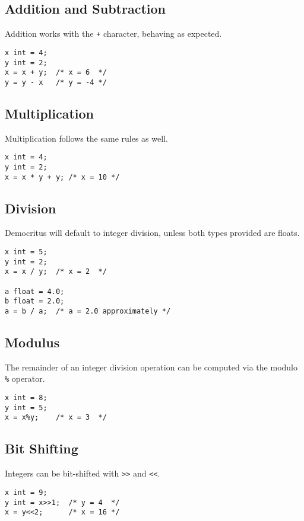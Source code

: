 		\subsection{Addition and Subtraction}
			Addition works with the \texttt{+} character, behaving as expected.
			\begin{lstlisting}
x int = 4;
y int = 2;
x = x + y; 	/* x = 6  */
y = y - x 	/* y = -4 */
			\end{lstlisting}
						
		\subsection{Multiplication}
			Multiplication follows the same rules as well. 
			\begin{lstlisting}
x int = 4;
y int = 2;
x = x * y + y; /* x = 10 */
			\end{lstlisting}
			

		\subsection{Division}
			Democritus will default to integer division, unless both types provided are floats. 
			\begin{lstlisting}
x int = 5;
y int = 2;
x = x / y; 	/* x = 2  */

a float = 4.0;
b float = 2.0;
a = b / a; 	/* a = 2.0 approximately */
			\end{lstlisting}

        \subsection{Modulus}
            The remainder of an integer division operation can be computed via the modulo \texttt{\%} operator.
            \begin{lstlisting}
x int = 8;
y int = 5;
x = x%y; 	/* x = 3  */
			\end{lstlisting}
	
		\subsection{Bit Shifting}
			Integers can be bit-shifted with \texttt{\textgreater\textgreater} and \texttt{\textless\textless}.
			\begin{lstlisting}
x int = 9;
y int = x>>1;  /* y = 4  */
x = y<<2; 	   /* x = 16 */
			\end{lstlisting}
		
